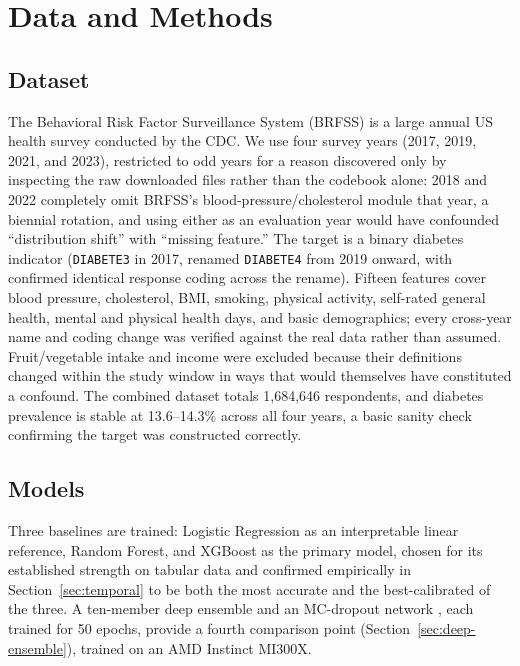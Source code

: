 \documentclass[11pt]{article}
\begin{document}
\section{Data and Methods}

\subsection{Dataset}

The Behavioral Risk Factor Surveillance System (BRFSS) is a large annual US health survey conducted by the CDC. We use four survey years (2017, 2019, 2021, and 2023), restricted to odd years for a reason discovered only by inspecting the raw downloaded files rather than the codebook alone: 2018 and 2022 completely omit BRFSS's blood-pressure/cholesterol module that year, a biennial rotation, and using either as an evaluation year would have confounded ``distribution shift'' with ``missing feature.'' The target is a binary diabetes indicator (\texttt{DIABETE3} in 2017, renamed \texttt{DIABETE4} from 2019 onward, with confirmed identical response coding across the rename). Fifteen features cover blood pressure, cholesterol, BMI, smoking, physical activity, self-rated general health, mental and physical health days, and basic demographics; every cross-year name and coding change was verified against the real data rather than assumed. Fruit/vegetable intake and income were excluded because their definitions changed within the study window in ways that would themselves have constituted a confound. The combined dataset totals 1{,}684{,}646 respondents, and diabetes prevalence is stable at 13.6--14.3\% across all four years, a basic sanity check confirming the target was constructed correctly.

\subsection{Models}

Three baselines are trained: Logistic Regression as an interpretable linear reference, Random Forest, and XGBoost as the primary model, chosen for its established strength on tabular data and confirmed empirically in Section~\ref{sec:temporal} to be both the most accurate and the best-calibrated of the three. A ten-member deep ensemble and an MC-dropout network \citep{lakshminarayanan2017ensembles,gal2016dropout}, each trained for 50 epochs, provide a fourth comparison point (Section~\ref{sec:deep-ensemble}), trained on an AMD Instinct MI300X.
\end{document}

